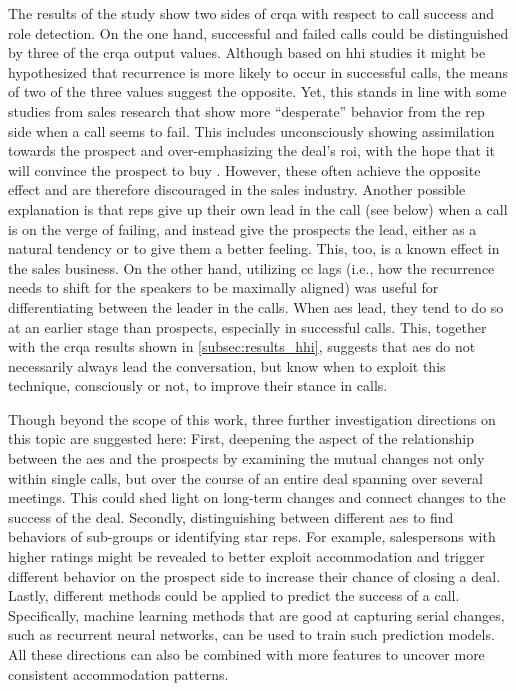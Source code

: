 The results of the study show two sides of \ac{crqa} with respect to call success and role detection.
On the one hand, successful and failed calls could be distinguished by three of the \ac{crqa} output values.
Although based on \ac{hhi} studies it might be hypothesized that recurrence is more likely to occur in successful calls, the means of two of the three values suggest the opposite.
Yet, this stands in line with some studies from sales research that show more \enquote{desperate} behavior from the rep side when a call seems to fail.
This includes unconsciously showing assimilation towards the prospect and over-emphasizing the deal's \ac{roi}, with the hope that it will convince the prospect to buy \citep{Orlob2018roi}.
However, these often achieve the opposite effect and are therefore discouraged in the sales industry.
Another possible explanation is that reps give up their own lead in the call (see below) when a call is on the verge of failing, and instead give the prospects the lead, either as a natural tendency or to give them a better feeling.
This, too, is a known effect in the sales business.
On the other hand, utilizing \acl{cc} lags (i.e., how the recurrence needs to shift for the speakers to be maximally aligned) was useful for differentiating between the leader in the calls.
When \acp{ae} lead, they tend to do so at an earlier stage than prospects, especially in successful calls.
This, together with the \ac{crqa} results shown in \cref{subsec:results_hhi}, suggests that \acp{ae} do not necessarily always lead the conversation, but know when to exploit this technique, consciously or not, to improve their stance in calls.

Though beyond the scope of this work, three further investigation directions on this topic are suggested here:
First, deepening the aspect of the relationship between the \acp{ae} and the prospects by examining the mutual changes not only within single calls, but over the course of an entire deal spanning over several meetings.
This could shed light on long-term changes and connect changes to the success of the deal.
Secondly, distinguishing between different \acp{ae} to find behaviors of sub-groups or identifying star reps.
For example, salespersons with higher ratings might be revealed to better exploit accommodation and trigger different behavior on the prospect side to increase their chance of closing a deal.
Lastly, different methods could be applied to predict the success of a call.
Specifically, machine learning methods that are good at capturing serial changes, such as recurrent neural networks, can be used to train such prediction models.
All these directions can also be combined with more features to uncover more consistent accommodation patterns.

